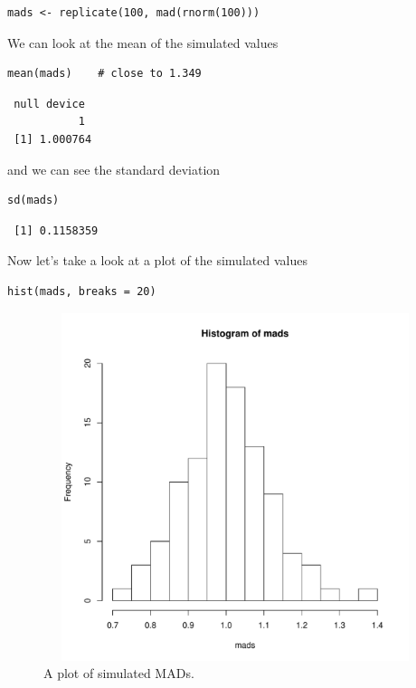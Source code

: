 \documentclass[captions=tableheading]{scrbook}
\begin{document}
\begin{verbatim}
mads <- replicate(100, mad(rnorm(100)))
\end{verbatim}

We can look at the mean of the simulated values


\begin{verbatim}
mean(mads)    # close to 1.349
\end{verbatim}

\begin{verbatim}
 null device 
           1
 [1] 1.000764
\end{verbatim}

and we can see the standard deviation


\begin{verbatim}
sd(mads)
\end{verbatim}

\begin{verbatim}
 [1] 0.1158359
\end{verbatim}

Now let's take a look at a plot of the simulated values


\begin{verbatim}
hist(mads, breaks = 20)
\end{verbatim}



\begin{figure}[th]
    \includegraphics[width=5in, height=4in]{img/simulated-MAD.pdf}
    \caption[Plot of simulated MADs]{\small A plot of simulated MADs.}
    \label{fig:simulated-MAD}
  \end{figure}
\end{document}
